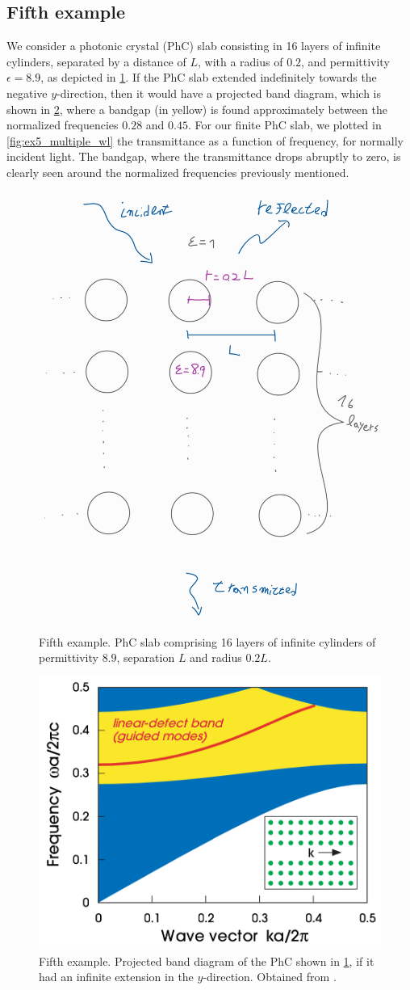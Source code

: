 \documentclass[reprint,amsmath,amssymb,
 aps]{revtex4-2}
\begin{document}
\subsection{Fifth example}
We consider a photonic crystal (PhC) slab consisting in 16 layers of infinite cylinders, separated by a distance of $L$, with a radius of $0.2$, and permittivity $\epsilon=8.9$, as depicted in \cref{fig:phc_multilayer}. If the PhC slab extended indefinitely towards the negative $y$-direction, then it would have a projected band diagram, which is shown in \cref{fig:phc_band}, where a bandgap (in yellow) is found approximately between the normalized frequencies $0.28$ and $0.45$. For our finite PhC slab, we plotted in \cref{fig:ex5_multiple_wl} the transmittance as a function of frequency, for normally incident light. The bandgap, where the transmittance drops abruptly to zero, is clearly seen around the normalized frequencies previously mentioned. 

\begin{figure}[h!]
\includegraphics[width=0.4\columnwidth]{figures/phc_multilayer.jpg}
\caption{Fifth example. PhC slab comprising 16 layers of infinite cylinders of permittivity $8.9$, separation $L$ and radius $0.2L$.}
\label{fig:phc_multilayer}
\end{figure}

\begin{figure}[h!]
\includegraphics[width=0.6\columnwidth]{figures/phc_band.png}
\caption{Fifth example. Projected band diagram of the PhC shown in \cref{fig:phc_multilayer}, if it had an infinite extension in the $y$-direction. Obtained from \cite{joannopoulos2008molding}.}
\label{fig:phc_band}
\end{figure}
\end{document}

